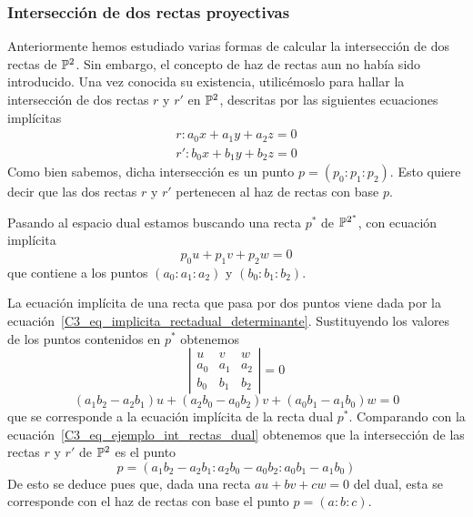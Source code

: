 \subsubsection{Intersección de dos rectas proyectivas}
Anteriormente hemos estudiado varias formas de calcular la intersección de dos rectas de $\mathbb{P}^2$. Sin embargo, el concepto de haz de rectas aun no había sido introducido. Una vez conocida su existencia, utilicémoslo para hallar la intersección de dos rectas $r$ y $r'$ en $\mathbb{P}^2$, descritas por las siguientes ecuaciones implícitas
\begin{equation*}
	\begin{split}
		r:a_0x+a_1y+a_2z=0\\
		r':b_0x+b_1y+b_2z=0
	\end{split}
\end{equation*}
Como bien sabemos, dicha intersección es un punto $p=(p_0:p_1:p_2)$. Esto quiere decir que las dos rectas $r$ y $r'$ pertenecen al haz de rectas con base $p$. 

Pasando al espacio dual estamos buscando una recta $p^*$ de $\mathbb{P}^{2^*}$, con ecuación implícita
\begin{equation}
	\label{C3_eq_ejemplo_int_rectas_dual}
	p_0u+p_1v+p_2w=0
\end{equation}
que contiene a los puntos $(a_0:a_1:a_2)$ y $(b_0:b_1:b_2)$. 

La ecuación implícita de una recta que pasa por dos puntos viene dada por la ecuación~\eqref{C3_eq_implicita_rectadual_determinante}. Sustituyendo los valores de los puntos contenidos en $p^*$ obtenemos
\begin{equation*}
	\left| \begin{array}{ccc}
	u & v & w \\
	a_0 & a_1 & a_2\\
	b_0 & b_1 & b_2
	\end{array}\right| =0
\end{equation*}
\begin{equation*}
	(a_1b_2-a_2b_1)u+(a_2b_0-a_0b_2)v+(a_0b_1-a_1b_0)w=0
\end{equation*}
que se corresponde a la ecuación implícita de la recta dual $p^*$. Comparando con la ecuación~\eqref{C3_eq_ejemplo_int_rectas_dual} obtenemos que la intersección de las rectas $r$ y $r'$ de $\mathbb{P}^2$ es el punto
\begin{equation*}
	p=(a_1b_2-a_2b_1:a_2b_0-a_0b_2:a_0b_1-a_1b_0)
\end{equation*}
De esto se deduce pues que, dada una recta $au+bv+cw=0$ del dual, esta se corresponde con el haz de rectas con base el punto $p=(a:b:c)$.
